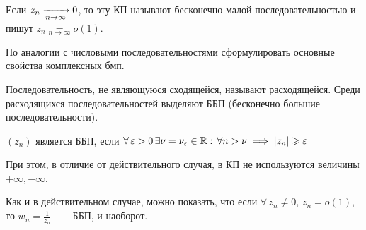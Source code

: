 \documentclass[../../main.tex]{subfiles}
\begin{document}
Если $ z_n \xrightarrow[n \rightarrow \infty]{} 0 $, то эту КП называют бесконечно 
малой последовательностью и пишут $ z_n \underset{n \to \infty}{=} o(1) $.

\begin{exc}
	По аналогии с числовыми последовательностями сформулировать основные свойства 
	комплексных бмп.
\end{exc}

\;

Последовательность, не являющуюся сходящейся, называют расходящейся. Среди 
расходящихся последовательностей выделяют ББП (бесконечно большие 
последовательности).

$ (z_n) $ является ББП, если $ \forall\, \varepsilon > 0\, \exists \nu = \nu_\varepsilon \in 
\mathbb{R}:\, \forall n > \nu \implies |z_n| \geqslant \varepsilon $

При этом, в отличие от действительного случая, в КП не используются величины $ 
+\infty, -\infty $.

Как и в действительном случае, можно показать, что если $ \forall\, z_n \neq 
0,\, z_n = o(1) $, то $ w_n = \frac{1}{z_n} $ ~--- ББП, и наоборот.
\end{document}

